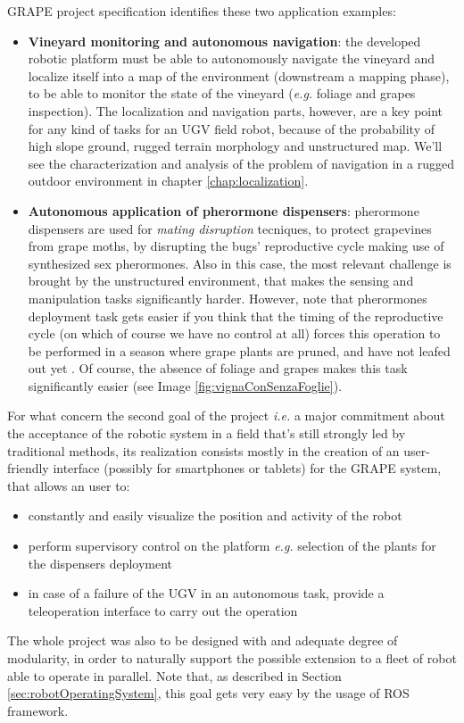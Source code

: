 \ac{GRAPE} project specification identifies these two application examples:
\begin{itemize}
	\item \textbf{Vineyard monitoring and autonomous navigation}: the developed robotic platform must be able to autonomously navigate the vineyard and localize itself into a map of the environment (downstream a mapping phase), to be able to monitor the state of the vineyard (\textit{e.g.} foliage and grapes inspection). The localization and navigation parts, however, are a key point for any kind of tasks for an \ac{UGV} field robot, because of the probability of high slope ground, rugged terrain morphology and unstructured map. We'll see the characterization and analysis of the problem of navigation in a rugged outdoor environment in chapter \ref{chap:localization}.
	\item \textbf{Autonomous application of pherormone dispensers}: pherormone dispensers are used for \textit{mating disruption} tecniques, to protect grapevines from grape moths, by disrupting the bugs' reproductive cycle making use of synthesized sex pherormones. Also in this case, the most relevant challenge is brought by the unstructured environment, that makes the sensing and manipulation tasks significantly harder.  However, note that pherormones deployment task gets easier if you think that the timing of the reproductive cycle (on which of course we have no control at all) forces this operation to be performed in a season where grape plants are pruned, and have not leafed out yet \parencite{mateDisruptionEfficiency}. Of course, the absence of foliage and grapes makes this task significantly easier (see Image \ref{fig:vignaConSenzaFoglie}).
\end{itemize}

For what concern the second goal of the project \textit{i.e.} a major commitment about the acceptance of the robotic system in a field that's still strongly led by traditional methods, its realization consists mostly in the creation of an user-friendly interface (possibly for smartphones or tablets) for the \ac{GRAPE} system, that allows an user to:
\begin{itemize}
	\item constantly and easily visualize the position and activity of the robot 
	\item perform supervisory control on the platform \textit{e.g.} selection of the plants for the dispensers deployment
	\item in case of a failure of the \ac{UGV} in an autonomous task, provide a teleoperation interface to carry out the operation
\end{itemize}
The whole project was also to be designed with and adequate degree of modularity, in order to naturally support the possible extension to a fleet of robot able to operate in parallel. Note that, as described in Section \ref{sec:robotOperatingSystem}, this goal gets very easy by the usage of \ac{ROS} framework.


